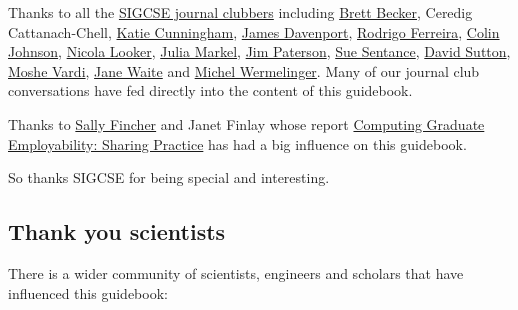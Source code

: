 \documentclass[
]{book}
\begin{document}
Thanks to all the \href{https://sigcse.cs.manchester.ac.uk}{SIGCSE journal clubbers} including \href{https://www.brettbecker.com/}{Brett Becker}, Ceredig Cattanach-Chell, \href{https://www.kicunningham.com/}{Katie Cunningham}, \href{https://en.wikipedia.org/wiki/James_H._Davenport}{James Davenport}, \href{https://riceacademy.rice.edu/junior-fellows/dr-rodrigo-ferreira}{Rodrigo Ferreira}, \href{https://www.nottingham.ac.uk/computerscience/people/colin.johnson}{Colin Johnson}, \href{https://www.gla.ac.uk/pgrs/nicolalooker/}{Nicola Looker}, \href{https://juliamarkel.github.io/}{Julia Markel}, \href{https://www.gcu.ac.uk/cebe/staff/jim\%20paterson/}{Jim Paterson}, \href{https://en.wikipedia.org/wiki/Sue_Sentance}{Sue Sentance}, \href{https://www.brookes.ac.uk/templates/pages/staff.aspx?uid=p0073862}{David Sutton}, \href{https://en.wikipedia.org/wiki/Moshe_Vardi}{Moshe Vardi}, \href{http://eecs.qmul.ac.uk/profiles/waitejanelisa.html}{Jane Waite} and \href{https://www.open.ac.uk/people/mw4687}{Michel Wermelinger}. Many of our journal club conversations have fed directly into the content of this guidebook.

Thanks to \href{https://en.wikipedia.org/wiki/Sally_Fincher}{Sally Fincher} and Janet Finlay whose report \href{https://kar.kent.ac.uk/53848}{Computing Graduate Employability: Sharing Practice} \citep{fincherreview} has had a big influence on this guidebook.

So thanks SIGCSE for being special and interesting. 🙏

\hypertarget{scientists}{%
\subsection{Thank you scientists}\label{scientists}}

There is a wider community of scientists, engineers and scholars that have influenced this guidebook:
\end{document}
